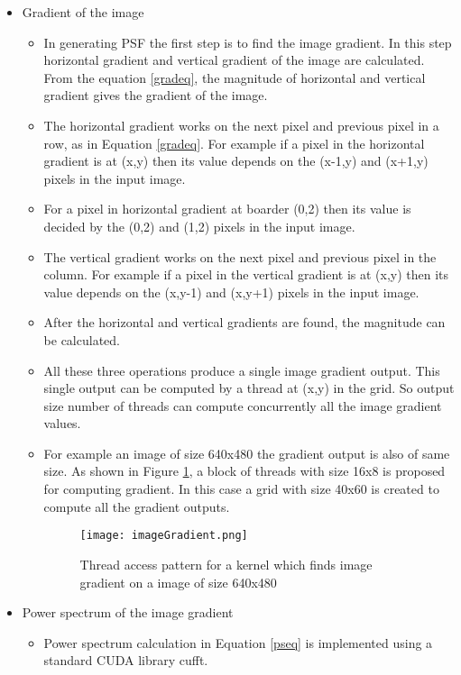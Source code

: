 \begin{itemize}	
	\item Gradient of the image
	\begin{itemize}
	\item In generating PSF the first step is to find the image gradient. In this step horizontal gradient and vertical gradient of the image are calculated. From the equation \ref{gradeq}, the magnitude of horizontal and vertical gradient gives the gradient of the image.
	\item The horizontal gradient works on the next pixel and previous pixel in a row, as in Equation \ref{gradeq}. For example if a pixel in the horizontal gradient is at (x,y) then its value depends on the (x-1,y) and (x+1,y) pixels in the input image.
	\item For a pixel in horizontal gradient at boarder (0,2) then its value is decided by the (0,2) and (1,2) pixels in the input image.
	\item The vertical gradient works on the next pixel and previous pixel in the column. For example if a pixel in the vertical gradient is at (x,y) then its value depends on the (x,y-1) and (x,y+1) pixels in the input image.
	\item After the horizontal and vertical gradients are found, the magnitude can be calculated.
	\item All these three operations produce a single image gradient output. This single output can be computed by a thread at (x,y) in the grid. So output size number of threads can compute concurrently all the image gradient values.
	\item For example an image of size 640x480 the gradient output is also of same size. As shown in Figure \ref{fig:imgradient}, a block of threads with size 16x8 is proposed for computing gradient. In this case a grid with size 40x60 is created to compute all the gradient outputs.	
	\begin{figure}[h!]
		\centering
		\texttt{[image: imageGradient.png]}
		\caption{Thread access pattern for a kernel which finds image gradient on a image of size 640x480}
		\label{fig:imgradient}
	\end{figure}	
\end{itemize}
	\item Power spectrum of the image gradient
\begin{itemize}
	\item Power spectrum calculation in Equation \ref{pseq} is implemented using a standard CUDA library cufft.

\end{itemize}
\end{itemize}
